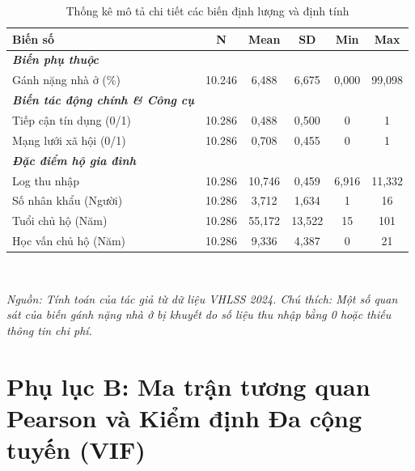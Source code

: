 \documentclass[12pt,a4paper]{report}
\begin{document}
\vspace{1cm}

\begin{table}[htbp]
	\centering
	\small %
	\caption{Thống kê mô tả chi tiết các biến định lượng và định tính}
	\label{tab:app_summary_stats}
	\renewcommand{\arraystretch}{1.2} %
	\setlength{\tabcolsep}{6pt} %
	\begin{tabular}{l c c c c c}
		\toprule
		\textbf{Biến số} & \textbf{N} & \textbf{Mean} & \textbf{SD} & \textbf{Min} & \textbf{Max} \\
		\midrule
		\textbf{\textit{Biến phụ thuộc}} & & & & & \\
		Gánh nặng nhà ở (\%) & 10.246 & 6,488 & 6,675 & 0,000 & 99,098 \\
		\midrule
		\textbf{\textit{Biến tác động chính \& Công cụ}} & & & & & \\
		Tiếp cận tín dụng (0/1) & 10.286 & 0,488 & 0,500 & 0 & 1 \\
		Mạng lưới xã hội (0/1) & 10.286 & 0,708 & 0,455 & 0 & 1 \\
		\midrule
		\textbf{\textit{Đặc điểm hộ gia đình}} & & & & & \\
		Log thu nhập & 10.286 & 10,746 & 0,459 & 6,916 & 11,332 \\
		Số nhân khẩu (Người) & 10.286 & 3,712 & 1,634 & 1 & 16 \\
		Tuổi chủ hộ (Năm) & 10.286 & 55,172 & 13,522 & 15 & 101 \\
		Học vấn chủ hộ (Năm) & 10.286 & 9,336 & 4,387 & 0 & 21 \\
		\bottomrule
	\end{tabular}
	\vspace{0.2cm} \\
	\raggedright \footnotesize \textit{Nguồn: Tính toán của tác giả từ dữ liệu VHLSS 2024. Chú thích: Một số quan sát của biến gánh nặng nhà ở bị khuyết do số liệu thu nhập bằng 0 hoặc thiếu thông tin chi phí.}
\end{table}


\newpage	
\section*{Phụ lục B: Ma trận tương quan Pearson và Kiểm định Đa cộng tuyến (VIF)}
\end{document}

